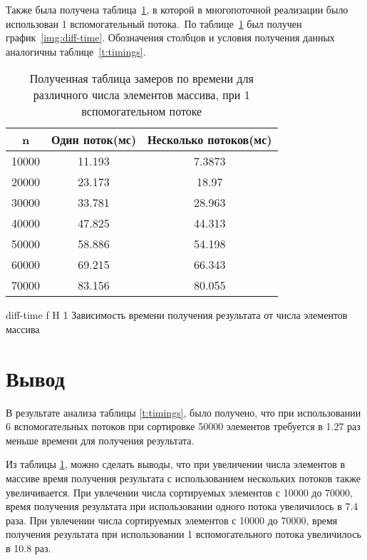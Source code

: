 Также была получена таблица~\ref{t:timings-n}, в которой в многопоточной реализации было использован 1 вспомогательный потока.~По таблице~\ref{t:timings-n} был получен график~\ref{img:diff-time}. 
Обозначения столбцов и условия получения данных аналогичны таблице~\ref{t:timings}.

\begin{table}[H]
	\centering
	\caption{Полученная таблица замеров по времени для различного числа элементов массива, при 1 вспомогательном потоке}
	\begin{tabular}{|c|c|c|}
		\hline
		n       & Один поток(мс) & Несколько потоков(мс) \\ \hline
		10000 & 11.193                  & 7.3873                            \\ \hline
		20000 & 23.173                  & 18.97                             \\ \hline
		30000 & 33.781                  & 28.963                            \\ \hline
		40000 & 47.825                  & 44.313                            \\ \hline
		50000 & 58.886                  & 54.198                            \\ \hline
		60000 & 69.215                  & 66.343                            \\ \hline
		70000 & 83.156                  & 80.055                            \\ \hline
	\end{tabular}
	\label{t:timings-n}
\end{table}




{diff-time} %
{f} %
{H} %
{1\textwidth} %
{Зависимость времени получения результата от числа элементов массива} %


\section*{Вывод}
В результате анализа таблицы \ref{t:timings}, было получено, что при использовании 6 вспомогательных потоков при сортировке 50000 элементов требуется в 1.27 раз меньше времени для получения результата. 

Из таблицы \ref{t:timings-n}, можно сделать выводы, что при увеличении числа элементов в массиве
время получения результата с использованием нескольких потоков также увеличивается. При увлечении числа сортируемых элементов с 10000 до 70000, время получения результата при использовании одного потока  увеличилось в 7.4 раза.
При увлечении числа сортируемых элементов с 10000 до 70000, время получения результата при использовании 1 вспомогательного потока увеличилось в 10.8 раз.


